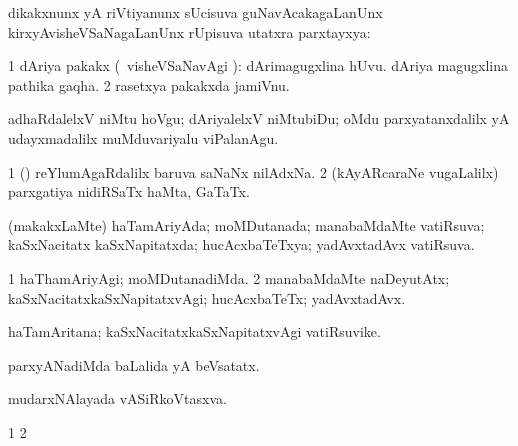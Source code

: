 \bentry
{} 
\gl{\uparx}
\expl{}
\bmng
dikakxnunx yA riVtiyanunx sUcisuva guNavAcakagaLanUnx kirxyAvisheVSaNagaLanUnx rUpisuva utatxra parxtayxya:  
\emng
\eentry

\bentry
{} 
\gl{\nA}
\expl{}
\bmng
\bnum
\num{1} dAriya pakakx (\kanmu\ visheVSaNavAgi \parx):  dArimagugxlina hUvu.  dAriya magugxlina pathika gaqha. 
\num{2} rasetxya pakakxda jamiVnu. 
\enum
\emng

\noindent
\gl{\pagu}
\expl{}
\bmng
{} adhaRdalelxV niMtu hoVgu; dAriyalelxV niMtubiDu; oMdu parxyatanxdalilx yA udayxmadalilx muMduvariyalu viPalanAgu. 
\emng
\eentry

\bentry
{} 
\gl{\nA}
\expl{}
\bmng
\bnum
\num{1} (\ame) reYlumAgaRdalilx baruva saNaNx nilAdxNa. 
\num{2} (kAyARcaraNe \mo vugaLalilx) parxgatiya nidiRSaTx haMta, GaTaTx. 
\enum
\emng
\eentry

\bentry
{} 
\gl{\gu}
\expl{}
\bmng
(makakxLaMte) haTamAriyAda; moMDutanada; manabaMdaMte vatiRsuva; kaSxNacitatx kaSxNapitatxda; hucAcxbaTeTxya; yadAvxtadAvx vatiRsuva. 
\emng
\eentry

\bentry
{} 
\gl{\kirxvi}
\expl{}
\bmng
\bnum
\num{1} haThamAriyAgi; moMDutanadiMda. 
\num{2} manabaMdaMte naDeyutAtx; kaSxNacitatxkaSxNapitatxvAgi; hucAcxbaTeTx; yadAvxtadAvx. 
\enum
\emng
\eentry

\bentry
{} 
\gl{\nA}
\expl{}
\bmng
haTamAritana; kaSxNacitatxkaSxNapitatxvAgi vatiRsuvike. 
\emng
\eentry

\bentry
{} 
\gl{\gu}
\expl{}
\bmng
parxyANadiMda baLalida yA beVsatatx. 
\emng
\eentry

\bentry
{} 
\gl{\nA}
\bmng
mudarxNAlayada vASiRkoVtasxva. 
\emng
\eentry

\bentry
{} 
\gl{\saMkiSx}
\expl{}
\bmng
{} 
\emng
\eentry

\bentry
{} 
\gl{\saMkiSx}
\expl{}
\bmng
\bnum
\num{1}  
\num{2}  
\enum
\emng
\eentry

\bentry
{} 
\gl{\saMkiSx}
\expl{}
\bmng
{} 
\emng
\eentry

